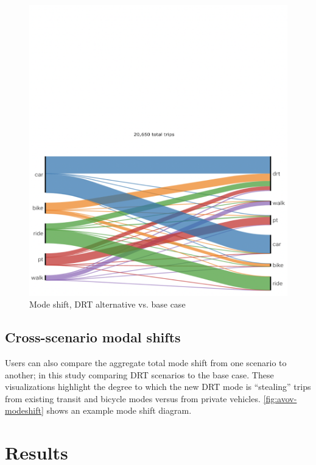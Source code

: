 \begin{figure}[ht]
\begin{minipage}[c]{0.45\textwidth}
     \includegraphics[width=\linewidth]{chapters/22-avov/images/fig-mode-share.png}
     \caption{Mode shift, DRT alternative vs. base case}
     \label{fig:avov-modeshift}
  \end{minipage}
\end{figure}

\subsection{Cross-scenario modal shifts}
\label{avov-mode-shifts}

Users can also compare the aggregate total mode shift from one scenario to another; in this study comparing DRT scenarios to the base case. These visualizations highlight the degree to which the new DRT mode is ``stealing'' trips from existing transit and bicycle modes versus from private vehicles. \autoref{fig:avov-modeshift} shows an example mode shift diagram.

\section{Results}
\label{avov-results}

